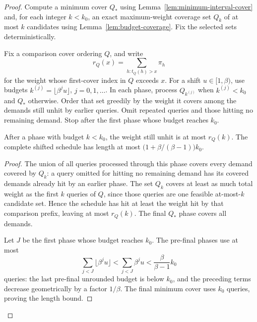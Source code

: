 \begin{proof}
Compute a minimum cover $Q_*$ using
Lemma~\ref{lem:minimum-interval-cover} and, for each integer $k<k_0$,
an exact maximum-weight coverage set $Q_k$ of at most $k$
candidates using Lemma~\ref{lem:budget-coverage}.
Fix the selected sets deterministically.

Fix a comparison cover ordering $Q$, and write
\[
 r_Q(x)=\sum_{h:t_Q(h)>x}\pi_h
\]
for the weight whose first-cover index in $Q$ exceeds $x$.
For a shift $u\in[1,\beta)$, use budgets
$k^{(j)}=\lfloor\beta^ju\rfloor$, $j=0,1,\ldots$.
In each phase, process $Q_{k^{(j)}}$ when $k^{(j)}<k_0$ and $Q_*$
otherwise. Order that set greedily by the weight it covers among
the demands still unhit by earlier queries. Omit repeated queries
and those hitting no remaining demand. Stop after the first phase
whose budget reaches $k_0$.
\begin{claim}
After a phase with budget $k<k_0$, the weight still unhit is at
most $r_Q(k)$. The complete shifted schedule has length at most
$\bigl(1+\beta/(\beta-1)\bigr)k_0$.
\end{claim}
\begin{proof}
The union of all queries processed through this phase covers every
demand covered by $Q_k$: a query omitted for hitting no remaining
demand has its covered demands already hit by an earlier phase.
The set $Q_k$ covers at least as much total weight as the first
$k$ queries of $Q$, since those queries are one feasible
at-most-$k$ candidate set. Hence the schedule has hit at least the
weight hit by that comparison prefix, leaving at most $r_Q(k)$.
The final $Q_*$ phase covers all demands.

Let $J$ be the first phase whose budget reaches $k_0$. The
pre-final phases use at most
\[
 \sum_{j<J}\lfloor\beta^ju\rfloor
 <\sum_{j<J}\beta^ju
 <\frac{\beta}{\beta-1}k_0
\]
queries: the last pre-final unrounded budget is below $k_0$, and
the preceding terms decrease geometrically by a factor $1/\beta$.
The final minimum cover uses $k_0$ queries, proving the length
bound.
\end{proof}


\end{proof}
